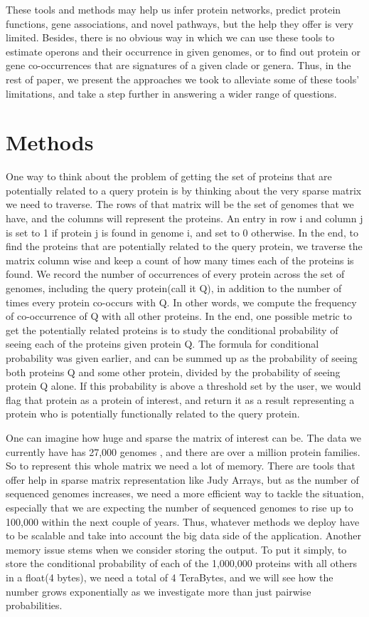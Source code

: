 \documentclass{ucetd}
\begin{document}
	These tools and methods may help us infer protein networks, predict protein functions, gene associations, and novel pathways, but the help they offer is very limited. Besides, there is no obvious way in which we can use these tools to estimate operons and their occurrence in given genomes, or to find out protein or gene co-occurrences that are signatures of a given clade or genera. Thus, in the rest of paper, we present the approaches we took to alleviate some of these tools' limitations, and take a step further in answering a wider range of questions. 
	
\chapter{Methods}
	One way to think about the problem of getting the set of proteins that are potentially related to a query protein is by thinking about the very sparse matrix we need to traverse. The rows of that matrix will be the set of genomes that we have, and the columns will represent the proteins. An entry in row i and column j is set to 1 if protein j is found in genome i, and set to 0 otherwise. In the end, to find the proteins that are potentially related to the query protein, we traverse the matrix column wise and keep a count of how many times each of the proteins is found. We record the number of occurrences of every protein across the set of genomes, including the query protein(call it Q), in addition to the number of times every protein co-occurs with Q. In other words, we compute the frequency of co-occurrence of Q with all other proteins. In the end, one possible metric to get the potentially related proteins is to study the conditional probability of seeing each of the proteins given protein Q. The formula for conditional probability was given earlier, and can be summed up as the probability of seeing both proteins Q and some other protein, divided by the probability of seeing protein Q alone. If this probability is above a threshold set by the user, we would flag that protein as a protein of interest, and return it as a result representing a protein who is potentially functionally related to the query protein. 

One can imagine how huge and sparse the matrix of interest can be. The data we currently have has 27,000 genomes , and there are over a million protein families. So to represent this whole matrix we need a lot of memory. There are tools that offer help in sparse matrix representation like Judy Arrays, but as the number of sequenced genomes increases, we need a more efficient way to tackle the situation, especially that we are expecting the number of sequenced genomes to rise up to 100,000 within the next couple of years. Thus, whatever methods we deploy have to be scalable and take into account the big data side of the application. 
Another memory issue stems when we consider storing the output. To put it simply, to store the conditional probability of each of the 1,000,000 proteins with all others in a float(4 bytes), we need a total of 4 TeraBytes, and we will see how the number grows exponentially as we investigate more than just pairwise probabilities. 
\end{document}
